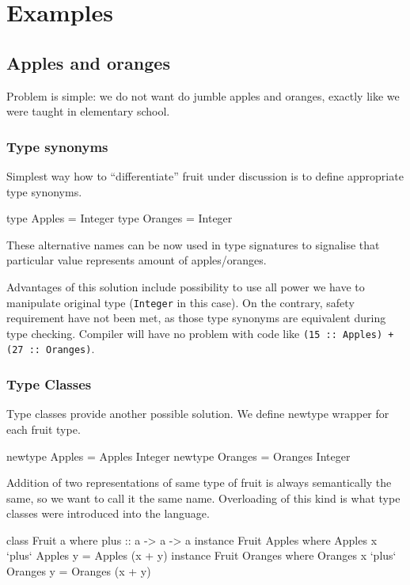 \documentclass[11pt,oneside,draft]{fithesis2}
\begin{document}
\chapter{Examples}

\section{Apples and oranges}

Problem is simple: we do not want do jumble apples and oranges,
exactly like we were taught in elementary school.

\subsection{Type synonyms}

Simplest way how to ``differentiate'' fruit under discussion is to define
appropriate type synonyms.
\begin{code}
type Apples  = Integer
type Oranges = Integer
\end{code}
These alternative names can be now used in type signatures to signalise that
particular value represents amount of apples/oranges.

Advantages of this solution include possibility to use all power we have
to manipulate original type (\texttt{Integer} in this case). On the contrary,
safety requirement have not been met, as those type synonyms are equivalent
during type checking. Compiler will have no problem with
code like \texttt{(15 :: Apples) + (27 :: Oranges)}.

\subsection{Type Classes}

Type classes provide another possible solution. We define newtype wrapper
for each fruit type.
\begin{code}
newtype Apples  = Apples  Integer
newtype Oranges = Oranges Integer
\end{code}

Addition of two representations of same type of fruit is always semantically
the same, so we want to call it the same name. Overloading of this kind is what
type classes were introduced into the language.
\begin{code}
class Fruit a where
    plus :: a -> a -> a
instance Fruit Apples where
	Apples x `plus` Apples y = Apples (x + y)
instance Fruit Oranges where
	Oranges x `plus` Oranges y = Oranges (x + y)
\end{code}
\end{document}
